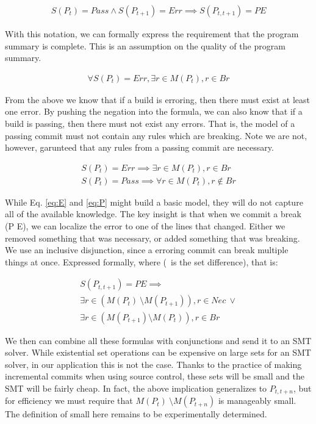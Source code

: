 \begin{align*}
  S(P_t)=Pass \land S(P_{t+1})=Err \implies S(P_{t,t+1}) = PE
\end{align*}

With this notation, we can formally express the requirement that the program summary is complete.
This is an assumption on the quality of the program summary.

\begin{align*}
  \forall S(P_t)=Err, \exists r \in M(P_t), r \in Br
\end{align*}

From the above we know that if a build is erroring, then there must exist at least one error.
By pushing the negation into the formula, we can also know that if a build is passing, then there must not exist any errors. 
That is, the model of a passing commit must not contain any rules which are breaking. 
Note we are not, however, garunteed that any rules from a passing commit are necessary.


\begin{align}
  S(P_t) = Err \implies \exists r \in  M (P_t), r \in Br \label{eq:E}\\
  S(P_t) = Pass \implies \forall r \in  M (P_t), r \notin Br \label{eq:P}
\end{align}

While Eq. \ref{eq:E} and \ref{eq:P} might build a basic model, they will do not capture all of the available knowledge.
The key insight is that when we commit a break (P E), we can localize the error to one of the lines that changed.
Either we removed something that was necessary, or added something that was breaking. 
We use an inclusive disjunction, since a erroring commit can break multiple things at once. 
Expressed formally, where (\ is the set difference), that is:


\begin{align}
  S(P_{t,t+1}) = PE \implies \nonumber \\
  \exists r \in (M(P_{t})\ \setminus M(P_{t+1})), r \in Nec\ \lor \nonumber \\
  \exists r \in (M(P_{t+1}) \setminus M(P_{t})), r \in Br \label{eq:PE}
\end{align}

We then can combine all these formulas with conjunctions and send it to an SMT solver.
While existential set operations can be expensive on large sets for an SMT solver, in our application this is not the case.
Thanks to the practice of making incremental commits when using source control, these sets will be small and the SMT will be fairly cheap. 
In fact, the above implication generalizes to $P_{t,t+n}$, but for efficiency we must require that $M(P_{t})\ \setminus M(P_{t+n})$ is manageably small. 
The definition of small here remains to be experimentally determined.


